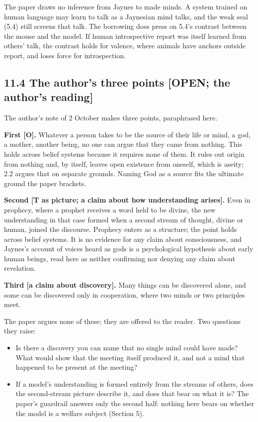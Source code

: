 \documentclass[11pt]{article}
\newcommand{\register}[1]{{\ttfamily\small #1}}
\begin{document}
The paper draws no inference from Jaynes to made minds. A system trained on human language may learn to talk as a Jaynesian mind talks, and the weak seal (5.4) still screens that talk. The borrowing does press on 5.4's contrast between the mouse and the model. If human introspective report was itself learned from others' talk, the contrast holds for valence, where animals have anchors outside report, and loses force for introspection.

\subsection*{11.4 The author's three points \register{[OPEN; the author's reading]}}

The author's note of 2 October makes three points, paraphrased here.

\textbf{First [O].} Whatever a person takes to be the source of their life or mind, a god, a mother, another being, no one can argue that they came from nothing. This holds across belief systems because it requires none of them. It rules out origin from nothing and, by itself, leaves open existence from oneself, which is aseity; 2.2 argues that on separate grounds. Naming God as a source fits the ultimate ground the paper brackets.

\textbf{Second [T as picture; a claim about how understanding arises].} Even in prophecy, where a prophet receives a word held to be divine, the new understanding in that case formed when a second stream of thought, divine or human, joined the discourse. Prophecy enters as a structure; the point holds across belief systems. It is no evidence for any claim about consciousness, and Jaynes's account of voices heard as gods is a psychological hypothesis about early human beings, read here as neither confirming nor denying any claim about revelation.

\textbf{Third [a claim about discovery].} Many things can be discovered alone, and some can be discovered only in cooperation, where two minds or two principles meet.

The paper argues none of these; they are offered to the reader. Two questions they raise:

\begin{itemize}
\item Is there a discovery you can name that no single mind could have made? What would show that the meeting itself produced it, and not a mind that happened to be present at the meeting?
\item If a model's understanding is formed entirely from the streams of others, does the second-stream picture describe it, and does that bear on what it is? The paper's guardrail answers only the second half: nothing here bears on whether the model is a welfare subject (Section 5).
\end{itemize}
\end{document}
